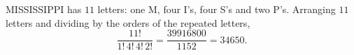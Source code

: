 MISSISSIPPI has $11$ letters: one M, four I's, four S's and two P's. Arranging $11$ letters and dividing by the orders of the repeated letters,
\[
\dfrac{11!}{1!\,4!\,4!\,2!}=\dfrac{39916800}{1152}=\boxed{34650}.
\]

